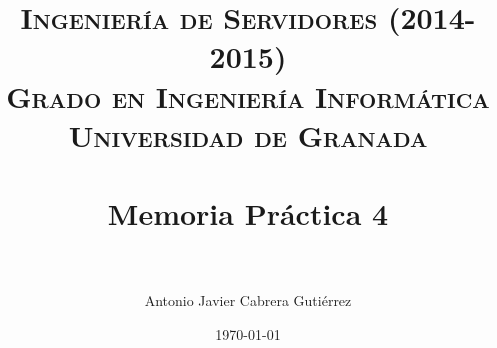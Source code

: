 


\title{	
\normalfont \normalsize 
\textsc{{\bf Ingeniería de Servidores (2014-2015)} \\ Grado en Ingeniería Informática \\ Universidad de Granada} \\ [25pt] %
\horrule{0.5pt} \\[0.4cm] %
\huge Memoria Práctica 4 \\ %
\horrule{2pt} \\[0.5cm] %
}

\author{Antonio Javier Cabrera Gutiérrez } %

\date{\normalsize\today} %




\maketitle %

\newpage %

\tableofcontents %

\listoffigures
\listoftables


\newpage
